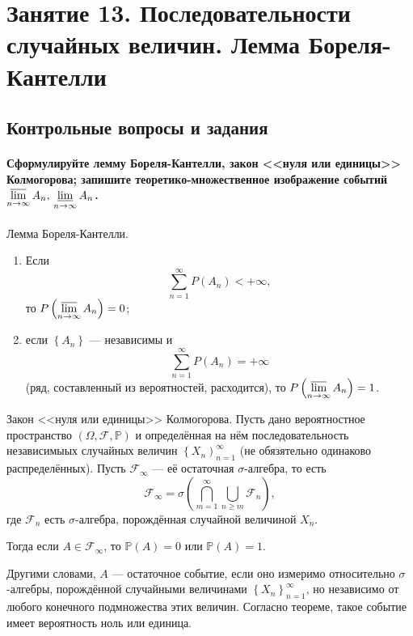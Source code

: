 \chapter*{Занятие 13. Последовательности случайных величин. Лемма Бореля-Кантелли}

\section*{Контрольные вопросы и задания}

\subsubsection*{Сформулируйте лемму Бореля-Кантелли, закон <<нуля или единицы>> Колмогорова; запишите теоретико-множественное изображение событий $ \varlimsup \limits_{n \to \infty } A_n, \, \varliminf \limits_{n \to \infty } A_n$.}

Лемма Бореля-Кантелли.
\begin{enumerate}
\item Если
$$ \sum \limits_{n=1}^{ \infty } P \left( A_n \right) < + \infty,$$
то $P \left( \varlimsup \limits_{n \to \infty } A_n \right) = 0$;
\item если $ \left\{ A_n \right\} $ --- независимы и
$$ \sum \limits_{n=1}^{ \infty } P \left( A_n \right) =
+ \infty $$
(ряд, составленный из вероятностей, расходится), то $P \left( \varlimsup \limits_{n \to \infty } A_n \right) = 1$.
\end{enumerate}

Закон <<нуля или единицы>> Колмогорова.
Пусть дано вероятностное пространство
$ \left( \Omega, \mathcal{F}, \mathbb{P} \right) $
и определённая на нём последовательность независимыых случайных величин
$ \left\{ X_n \right)_{n=1}^{ \infty } $ (не обязятельно одинаково распределённых).
Пусть $ \mathcal{F}_{ \infty }$ --- её остаточная $ \sigma $-алгебра, то есть
$$ \mathcal{F}_{ \infty } =
\sigma \left( \bigcap \limits_{m=1}^{ \infty } \bigcup \limits_{n \geq m} \mathcal{F}_n \right),$$
где $ \mathcal{F}_n $ есть $ \sigma $-алгебра, порождённая случайной величиной $X_n$.

Тогда если $A \in \mathcal{F}_{ \infty }$, то $ \mathbb{P} \left( A \right) = 0$ или $ \mathbb{P} \left( A \right) = 1$.

Другими словами, $A$ --- остаточное событие, если оно измеримо относительно $ \sigma $-алгебры,
порождённой случайными величинами $ \left\{ X_n \right\}_{n=1}^{ \infty }$, но независимо от любого конечного подмножества этих величин.
Согласно теореме, такое событие имеет вероятность ноль или единица.

